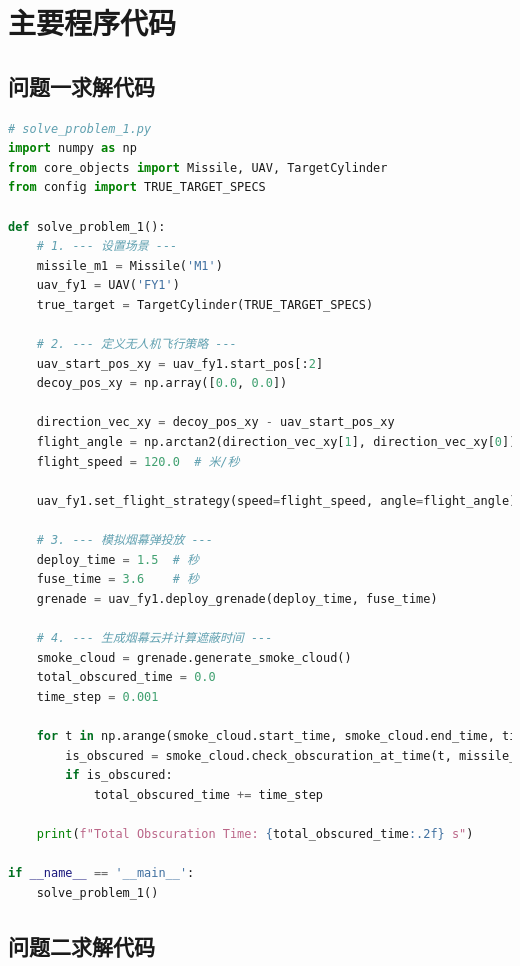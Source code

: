\documentclass[fontset=SimSun]{ctexart}
\begin{document}
\section{主要程序代码}
\label{sec:source_code}

\subsection{问题一求解代码}

\begin{lstlisting}[language=Python, caption=问题一求解代码]
# solve_problem_1.py
import numpy as np
from core_objects import Missile, UAV, TargetCylinder
from config import TRUE_TARGET_SPECS

def solve_problem_1():
    # 1. --- 设置场景 ---
    missile_m1 = Missile('M1')
    uav_fy1 = UAV('FY1')
    true_target = TargetCylinder(TRUE_TARGET_SPECS)

    # 2. --- 定义无人机飞行策略 ---
    uav_start_pos_xy = uav_fy1.start_pos[:2]
    decoy_pos_xy = np.array([0.0, 0.0])
    
    direction_vec_xy = decoy_pos_xy - uav_start_pos_xy
    flight_angle = np.arctan2(direction_vec_xy[1], direction_vec_xy[0])
    flight_speed = 120.0  # 米/秒
    
    uav_fy1.set_flight_strategy(speed=flight_speed, angle=flight_angle)

    # 3. --- 模拟烟幕弹投放 ---
    deploy_time = 1.5  # 秒
    fuse_time = 3.6    # 秒
    grenade = uav_fy1.deploy_grenade(deploy_time, fuse_time)

    # 4. --- 生成烟幕云并计算遮蔽时间 ---
    smoke_cloud = grenade.generate_smoke_cloud()
    total_obscured_time = 0.0
    time_step = 0.001
    
    for t in np.arange(smoke_cloud.start_time, smoke_cloud.end_time, time_step):
        is_obscured = smoke_cloud.check_obscuration_at_time(t, missile_m1, true_target)
        if is_obscured:
            total_obscured_time += time_step
            
    print(f"Total Obscuration Time: {total_obscured_time:.2f} s")

if __name__ == '__main__':
    solve_problem_1()
\end{lstlisting}

\subsection{问题二求解代码}
\end{document}
